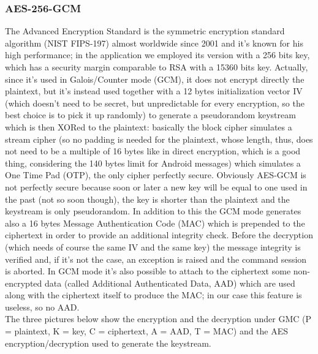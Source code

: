 \documentclass[a4paper,12pt]{article}
\begin{document}
\subsubsection{AES-256-GCM}
\small{The Advanced Encryption Standard is the symmetric encryption standard algorithm (NIST FIPS-197) almost worldwide since 2001 and it's known for his high performance; in the application we employed its version with a 256 bits key, which has a security margin comparable to RSA with a 15360 bits key. Actually, since it's used in Galois/Counter mode (GCM), it does not encrypt directly the plaintext, but it's instead used together with a 12 bytes initialization vector IV (which doesn't need to be secret, but unpredictable for every encryption, so the best choice is to pick it up randomly) to generate a pseudorandom keystream which is then XORed to the plaintext: basically the block cipher simulates a stream cipher (so no padding is needed for the plaintext, whose length, thus, does not need to be a multiple of 16 bytes like in direct encryption, which is a good thing, considering the 140 bytes limit for Android messages) which simulates a One Time Pad (OTP), the only cipher perfectly secure. Obviously AES-GCM is not perfectly secure because soon or later a new key will be equal to one used in the past (not so soon though), the key is shorter than the plaintext and the keystream is only pseudorandom. In addition to this the GCM mode generates also a 16 bytes Message Authentication Code (MAC) which is prepended to the ciphertext in order to provide an additional integrity check. Before the decryption (which needs of course the same IV and the same key) the message integrity is verified and, if it's not the case, an exception is raised and the command session is aborted. In GCM mode it's also possible to attach to the ciphertext some non-encrypted data (called Additional Authenticated Data, AAD) which are used along with the ciphertext itself to produce the MAC; in our case this feature is useless, so no AAD.\\The three pictures below show the encryption and the decryption under GMC (P = plaintext, K = key, C = ciphertext, A = AAD, T = MAC) and the AES encryption/decryption used to generate the keystream.}\\

\vspace{1cm}
\\
\end{document}
